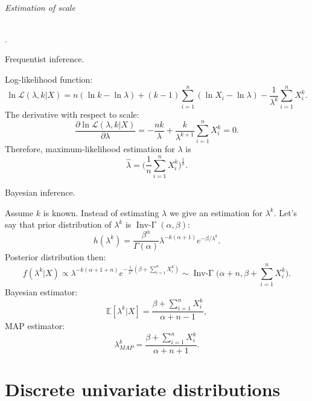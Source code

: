\documentclass[a4paper,11pt]{article}
\theoremstyle{plain}
\theoremstyle{definition}
\newcommand{\ME}{\mathbb{E}}
\begin{document}
\paragraph{Estimation of scale}.
\subparagraph{Frequentist inference.} Log-likelihood function:
\[
\ln \mathcal{L}(\lambda, k|X) = n (\ln k - \ln \lambda) + (k-1)\sum_{i=1}^{n}(\ln X_i - \ln \lambda) - \frac{1}{\lambda^k}\sum_{i=1}^{n} X_i^k.
\]
The derivative with respect to scale:
\[
\frac{\partial\ln \mathcal{L}(\lambda, k|X) }{\partial \lambda} = -\frac{n k}{\lambda} + \frac{k}{\lambda^{k+1}} \sum_{i=1}^{n} X_i^k=0.
\]
Therefore, maximum-likelihood estimation for $\lambda$ is
\[
\hat{\lambda} = \bigg(\frac{1}{n}\sum_{i=1}^{n}X_i^k\bigg)^{\frac{1}{k}}.
\]
\subparagraph{Bayesian inference.} Assume $k$ is known. Instead of estimating $\lambda$ we give an estimation for $\lambda^k$. Let's say that prior distribution of $\lambda^k$ is $\operatorname{Inv-\Gamma}(\alpha, \beta)$:
\[
h(\lambda^k) = \frac{\beta^\alpha}{\Gamma(\alpha)} \lambda^{-k(\alpha+1)} e^{-\beta / \lambda^k}.
\]
Posterior distribution then:
\[
f(\lambda^k| X) \propto \lambda^{-k(\alpha+1+n)} e^{-\frac{1}{\lambda^k} (\beta+\sum_{i=1}^{n}X_i^k)} \sim \operatorname{Inv-\Gamma}\bigg(\alpha+n, \beta+\sum_{i=1}^{n}X_i^k\bigg).
\]
Bayesian estimator:
\[
\ME[\lambda^k|X] = \frac{\beta+\sum_{i=1}^{n}X_i^k}{\alpha+n-1},
\]
MAP estimator:
\[
\lambda_{MAP}^k = \frac{\beta+\sum_{i=1}^{n}X_i^k}{\alpha+n+1}.
\]

	\pagebreak
	\part{Discrete univariate distributions}
\end{document}
